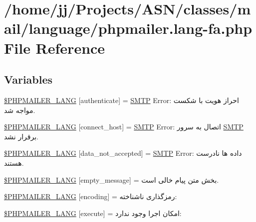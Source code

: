 \hypertarget{phpmailer_8lang-fa_8php}{}\section{/home/jj/\+Projects/\+A\+S\+N/classes/mail/language/phpmailer.lang-\/fa.php File Reference}
\label{phpmailer_8lang-fa_8php}
\subsection*{Variables}
\begin{DoxyCompactItemize}
\item 
\hyperlink{phpmailer_8lang-fa_8php_a2cb33073c989b85580748e331ed8b4aa}{\$\+P\+H\+P\+M\+A\+I\+L\+E\+R\+\_\+\+L\+A\+NG} \mbox{[}\textquotesingle{}authenticate\textquotesingle{}\mbox{]} = \textquotesingle{}\hyperlink{class_s_m_t_p}{S\+M\+TP} Error\+: احراز هویت با شکست مواجه شد.\textquotesingle{}
\item 
\hyperlink{phpmailer_8lang-fa_8php_a2ee0cc637a06b96e45600db31c6799ee}{\$\+P\+H\+P\+M\+A\+I\+L\+E\+R\+\_\+\+L\+A\+NG} \mbox{[}\textquotesingle{}connect\+\_\+host\textquotesingle{}\mbox{]} = \textquotesingle{}\hyperlink{class_s_m_t_p}{S\+M\+TP} Error\+: اتصال به سرور \hyperlink{class_s_m_t_p}{S\+M\+TP} برقرار نشد.\textquotesingle{}
\item 
\hyperlink{phpmailer_8lang-fa_8php_a814c6b191205d2361b3233e9c9d6fda5}{\$\+P\+H\+P\+M\+A\+I\+L\+E\+R\+\_\+\+L\+A\+NG} \mbox{[}\textquotesingle{}data\+\_\+not\+\_\+accepted\textquotesingle{}\mbox{]} = \textquotesingle{}\hyperlink{class_s_m_t_p}{S\+M\+TP} Error\+: داده ها نادرست هستند.\textquotesingle{}
\item 
\hyperlink{phpmailer_8lang-fa_8php_a33772099f637c9d6c2cd7425e0e37fed}{\$\+P\+H\+P\+M\+A\+I\+L\+E\+R\+\_\+\+L\+A\+NG} \mbox{[}\textquotesingle{}empty\+\_\+message\textquotesingle{}\mbox{]} = \textquotesingle{}بخش متن پیام خالی است.\textquotesingle{}
\item 
\hyperlink{phpmailer_8lang-fa_8php_a817f7283f3d54c970a0c10305cc668cc}{\$\+P\+H\+P\+M\+A\+I\+L\+E\+R\+\_\+\+L\+A\+NG} \mbox{[}\textquotesingle{}encoding\textquotesingle{}\mbox{]} = \textquotesingle{}رمزگذاری ناشناخته\+: \textquotesingle{}
\item 
\hyperlink{phpmailer_8lang-fa_8php_a668217a9563a168f30f2a8548b6ed5a9}{\$\+P\+H\+P\+M\+A\+I\+L\+E\+R\+\_\+\+L\+A\+NG} \mbox{[}\textquotesingle{}execute\textquotesingle{}\mbox{]} = \textquotesingle{}امکان اجرا وجود ندارد\+: \textquotesingle{}

\end{DoxyCompactItemize}
